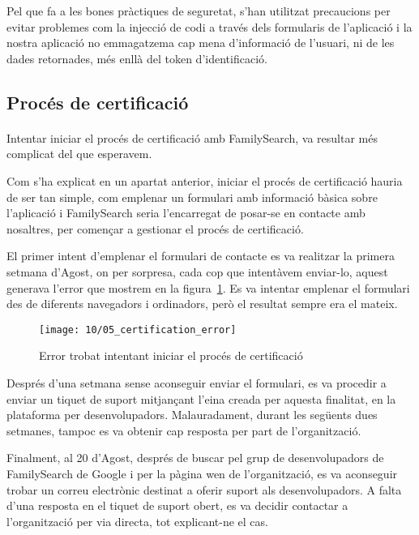    Pel que fa a les bones pràctiques de seguretat, s'han utilitzat precaucions per evitar problemes com la injecció de codi a través dels formularis de l'aplicació i la nostra aplicació no emmagatzema cap mena d'informació de l'usuari, ni de les dades retornades, més enllà del token d'identificació.


    \subsection{Procés de certificació}

    \paragraph{}
    Intentar iniciar el procés de certificació amb FamilySearch, va resultar més complicat del que esperavem.

    Com s’ha explicat en un apartat anterior, iniciar el procés de certificació hauria de ser tan simple, com emplenar un formulari amb informació bàsica sobre l’aplicació i FamilySearch seria l’encarregat de posar-se en contacte amb nosaltres, per començar a gestionar el procés de certificació.

    El primer intent d’emplenar el formulari de contacte es va realitzar la primera setmana d’Agost, on per sorpresa, cada cop que intentàvem enviar-lo, aquest generava l’error que mostrem en la figura~\ref{fig:errorCErtification}. Es va intentar emplenar el formulari des de diferents navegadors i ordinadors, però el resultat sempre era el mateix.

    \begin{figure}[h]
        \texttt{[image: 10/05\_certification\_error]}
        \centering
        \caption{Error trobat intentant iniciar el procés de certificació}\label{fig:errorCErtification}
    \end{figure}

    Després d’una setmana sense aconseguir enviar el formulari, es va procedir a enviar un tiquet de suport mitjançant l’eina creada per aquesta finalitat, en la plataforma per desenvolupadors. Malauradament, durant les següents dues setmanes, tampoc es va obtenir cap resposta per part de l'organització.

    Finalment, al 20 d’Agost, després de buscar pel grup de desenvolupadors de FamilySearch de Google i per la pàgina wen de l’organització, es va aconseguir trobar un correu electrònic destinat a oferir suport als desenvolupadors. A falta d’una resposta en el tiquet de suport obert, es va decidir contactar a l'organització per via directa, tot explicant-ne el cas.

